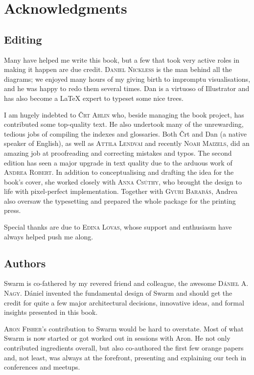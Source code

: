 \newcommand{\person}[1]{{\scshape #1}}
\chapter{Acknowledgments \statusgreen}

\section*{Editing}

Many have helped me write this book, but a few that took very active roles in making it happen are due credit. \person{Daniel Nickless} is the man behind all the diagrams; we enjoyed many hours of my giving birth to impromptu visualisations, and he was happy to redo them several times. Dan is a virtuoso of Illustrator and has also become a LaTeX expert to typeset some nice trees. 

I am hugely indebted to \person{Črt Ahlin} who, beside managing the book project, has contributed some top-quality text.
He also undertook many of the unrewarding, tedious jobs of compiling the indexes and glossaries. Both Črt and Dan (a native speaker of English), as well as \person{Attila Lendvai} and recently \person{Noah Maizels}, did an amazing job at proofreading and correcting mistakes and typos.
The second edition has seen a major upgrade in text quality due to the arduous work of \person{Andrea Robert}. In addition to conceptualising and drafting the idea for the book's cover, she worked closely with \person{Anna Csúthy}, who brought the design to life with pixel-perfect implementation. Together with \person{Gyuri Barabás}, Andrea also oversaw the typesetting and prepared the whole package for the printing press.

Special thanks are due to \person{Edina Lovas}, whose support and enthusiasm have always helped push me along. 

\section*{Authors}

Swarm is co-fathered by my revered friend and colleague, the awesome \person{D{\'a}niel A. Nagy}.  D{\'a}niel invented the fundamental design of Swarm and should get the credit for quite a few major architectural decisions, innovative ideas, and formal insights presented in this book. 

\person{Aron Fisher}'s contribution to Swarm would be hard to overstate. Most of what Swarm is now started or got worked out in sessions with Aron.  He not only contributed ingredients overall, but also co-authored the first few orange papers and, not least, was always at the forefront, presenting and explaining our tech in conferences and meetups.

